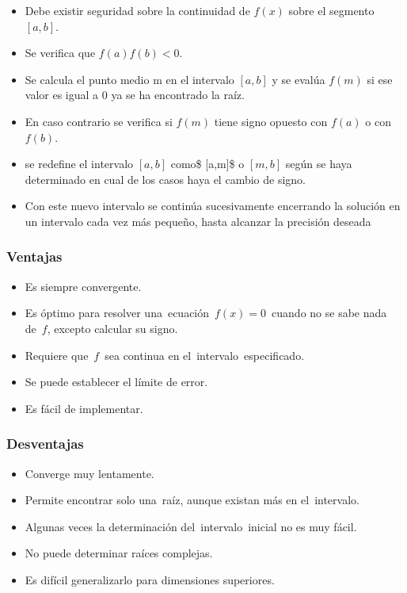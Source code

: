 \documentclass[11pt,]{article}
\providecommand{\tightlist}{%
\setlength{\itemsep}{0pt}\setlength{\parskip}{0pt}}
\begin{document}
\begin{itemize}
\tightlist
\item
  Debe existir seguridad sobre la continuidad de \(f(x)\) sobre el
  segmento \([a,b]\).
\item
  Se verifica que \(f(a)f(b)<0\).
\item
  Se calcula el punto medio m en el intervalo \([a,b]\) y se evalúa
  \(f(m)\) si ese valor es igual a 0 ya se ha encontrado la raíz.
\item
  En caso contrario se verifica si \(f(m)\) tiene signo opuesto con
  \(f(a)\) o con \(f(b)\).
\item
  se redefine el intervalo \([a,b]\) como\$ {[}a,m{]}\$ o \([m,b]\)
  según se haya determinado en cual de los casos haya el cambio de
  signo.
\item
  Con este nuevo intervalo se continúa sucesivamente encerrando la
  solución en un intervalo cada vez más pequeño, hasta alcanzar la
  precisión deseada
\end{itemize}

\hypertarget{ventajas}{%
\subsubsection{Ventajas}\label{ventajas}}

\begin{itemize}
\tightlist
\item
  Es siempre convergente.
\item
  Es óptimo para resolver una~ecuación~\(f(x)=0\)~cuando no se sabe nada
  de~\(f\), excepto calcular su signo.
\item
  Requiere que~\(f\)~sea continua en el~intervalo~especificado.
\item
  Se puede establecer el límite de error.
\item
  Es fácil de implementar.
\end{itemize}

\hypertarget{desventajas}{%
\subsubsection{Desventajas}\label{desventajas}}

\begin{itemize}
\tightlist
\item
  Converge muy lentamente.
\item
  Permite encontrar solo una~raíz, aunque existan más en el~intervalo.
\item
  Algunas veces la determinación del~intervalo~inicial no es muy fácil.
\item
  No puede determinar raíces complejas.
\item
  Es difícil generalizarlo para dimensiones superiores.
\end{itemize}
\end{document}
